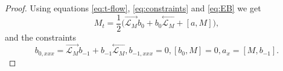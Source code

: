 \documentclass[10pt,a4paper]{amsart}
\newcommand{\InMb}{\stackrel{\leftarrow}{\mathcal{L}_{M}}}
\newcommand{\InMf}{\stackrel{\rightarrow}{\mathcal{L}_{M}}}
\begin{document}
\begin{proof} 
Using equations \eqref{eq:t-flow}, \eqref{eq:constraints} and \eqref{eq:EB} we get
\begin{equation} 
M_t=\frac12\big(\InMf b_0+b_0\InMb+[a,M]\big) \label{eq:Mt}, 
\end{equation}
and the constraints 
\begin{subequations}
\begin{equation}
b_{0,xxx}=\InMf b_{-1}+b_{-1}\InMb, \label{eq:b0}
\end{equation}
\begin{equation}
b_{-1,xxx}=0, \label{eq:b-1}
\end{equation}
\begin{equation}
[b_0, M]=0, \label{eq:b0M}
\end{equation}
\begin{equation}
a_{x}=[M,b_{-1}].  \label{eq:a0x}
\end{equation}
\end{subequations}


\end{proof}
\end{document}
